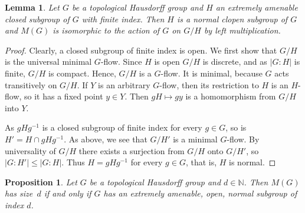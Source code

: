 \documentclass[12pt]{amsart}
\theoremstyle{plain}
\newtheorem{lemma}[theorem]{Lemma}
\newtheorem{proposition}[theorem]{Proposition}
\theoremstyle{definition}
\begin{document}
\begin{lemma}\label{lem:todorpart}
 Let $G$ be a topological Hausdorff group and $H$ an extremely amenable closed subgroup of $G$ with finite index. Then $H$ is a 
normal clopen subgroup of $G$ and $M(G)$ is isomorphic to the action of $G$ on $G/H$ by left multiplication.
\end{lemma}

\begin{proof} Clearly, a closed subgroup of finite index is open. We first show that $G/H$ is the universal minimal $G$-flow.
Since $H$ is open $G/H$ is discrete, and as $|G:H|$ is finite, $G/H$ is compact. Hence, $G/H$ is a $G$-flow. 
It is minimal, because $G$ acts 
transitively on $G/H$. If $Y$ is an arbitrary $G$-flow, 
then its restriction to $H$ is an $H$-flow, so it has a fixed point $y\in Y$. Then $gH\mapsto gy$ is
a homomorphism from $G/H$ into $Y$. 

As $gHg^{-1}$ is a closed subgroup of finite index for every $g\in G$, 
so is $H'=H\cap gHg^{-1}$. As above, we see that $G/H'$ is a minimal $G$-flow. By universality of $G/H$ 
there exists a surjection from $G/H$ onto $G/H'$, so $|G:H'|\le |G:H|$. Thus $H= gHg^{-1}$ for every $g\in G$, 
that is, $H$ is normal.
\end{proof}

\begin{proposition}\label{prop:todor}  Let $G$ be a topological Hausdorff group and $d\in\mathbb N$. Then 
$M(G)$ has size~$d$ if and only if 
$G$ has an extremely amenable, open, normal subgroup of index $d$.
\end{proposition}
\end{document}
